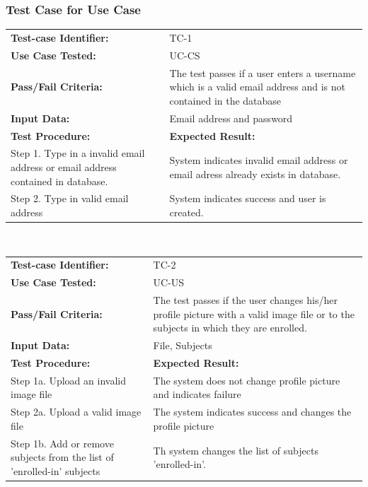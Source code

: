 \documentclass[12pt]{article}
\begin{document}
{


\subsubsection{Test Case for Use Case}
\centering
\begin{tabular}{| p{8cm} | p{8cm} |} \hline
	\textbf{Test-case Identifier:}& TC-1\\
	\textbf{Use Case Tested:}& UC-CS\\
	\textbf{Pass/Fail Criteria:}& The test passes if a user enters a username which is a valid email address
	and is not contained in the database\\
	\textbf{Input Data:}& Email address and password\\\hline
	\textbf{Test Procedure:}& \textbf{Expected Result:} \\\hline
	Step 1. Type in a invalid email address or email address contained in database.
	& System indicates invalid email address or email adress already exists in database.\\
	Step 2. Type in valid email address  & System indicates success and user is created.\\\hline
\end{tabular}
\\


\begin{tabular}{| p{8cm} | p{8cm} |} \hline
	\textbf{Test-case Identifier:}& TC-2\\
	\textbf{Use Case Tested:}& UC-US\\
	\textbf{Pass/Fail Criteria:}& The test passes if the user changes his/her profile picture with a valid image file or to the subjects in which they are enrolled.\\
	\textbf{Input Data:}& File, Subjects\\\hline
	\textbf{Test Procedure:}& \textbf{Expected Result:} \\\hline
	Step 1a. Upload an invalid image file & The system does not change profile picture and indicates failure\\
	Step 2a. Upload a valid image file & The system indicates success and changes the profile picture\\
		Step 1b. Add or remove subjects from the list of 'enrolled-in' subjects & Th system changes the list of subjects 'enrolled-in'.  \\\hline
\end{tabular}
\\

}
\end{document}
